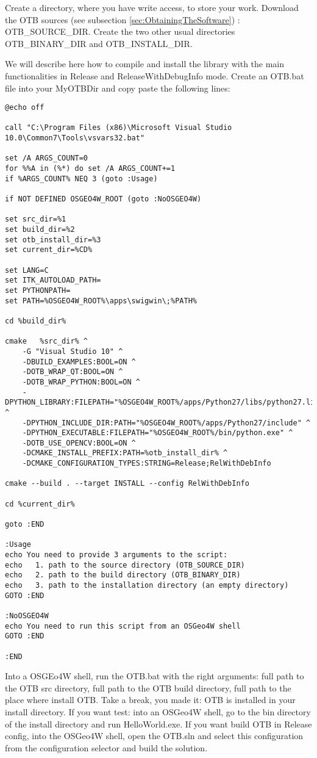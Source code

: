 Create a directory, where you have write access, to store your work.
Download the OTB sources (see subsection \ref{sec:ObtainingTheSoftware}) : OTB\_SOURCE\_DIR.
Create the two other usual directories OTB\_BINARY\_DIR and OTB\_INSTALL\_DIR.


We will describe here how to compile and install the library with the main functionalities in Release and ReleaseWithDebugInfo mode.
Create an OTB.bat file into your MyOTBDir and copy paste the following lines:

\begin{verbatim}
@echo off

call "C:\Program Files (x86)\Microsoft Visual Studio 10.0\Common7\Tools\vsvars32.bat"

set /A ARGS_COUNT=0    
for %%A in (%*) do set /A ARGS_COUNT+=1  
if %ARGS_COUNT% NEQ 3 (goto :Usage)

if NOT DEFINED OSGEO4W_ROOT (goto :NoOSGEO4W)
	
set src_dir=%1
set build_dir=%2
set otb_install_dir=%3
set current_dir=%CD%

set LANG=C
set ITK_AUTOLOAD_PATH=
set PYTHONPATH=
set PATH=%OSGEO4W_ROOT%\apps\swigwin\;%PATH%

cd %build_dir%

cmake 	%src_dir% ^
	-G "Visual Studio 10" ^
	-DBUILD_EXAMPLES:BOOL=ON ^
	-DOTB_WRAP_QT:BOOL=ON ^
	-DOTB_WRAP_PYTHON:BOOL=ON ^
	-DPYTHON_LIBRARY:FILEPATH="%OSGEO4W_ROOT%/apps/Python27/libs/python27.lib" ^
	-DPYTHON_INCLUDE_DIR:PATH="%OSGEO4W_ROOT%/apps/Python27/include" ^
	-DPYTHON_EXECUTABLE:FILEPATH="%OSGEO4W_ROOT%/bin/python.exe" ^
	-DOTB_USE_OPENCV:BOOL=ON ^
	-DCMAKE_INSTALL_PREFIX:PATH=%otb_install_dir% ^
	-DCMAKE_CONFIGURATION_TYPES:STRING=Release;RelWithDebInfo

cmake --build . --target INSTALL --config RelWithDebInfo

cd %current_dir%

goto :END

:Usage
echo You need to provide 3 arguments to the script: 
echo   1. path to the source directory (OTB_SOURCE_DIR)
echo   2. path to the build directory (OTB_BINARY_DIR)
echo   3. path to the installation directory (an empty directory)
GOTO :END

:NoOSGEO4W
echo You need to run this script from an OSGeo4W shell
GOTO :END

:END
\end{verbatim}
Into a OSGEo4W shell, run the OTB.bat with the right arguments: full path to the OTB src directory, full path to the OTB build directory, full path to the place where install OTB. Take a break, you made it: OTB is installed in your install directory. If you want test: into an OSGeo4W shell, go to the bin directory of the install directory and run HelloWorld.exe. If you want build OTB in Release config, into the OSGeo4W shell, open the OTB.sln and select this configuration from the configuration selector and build the solution.

